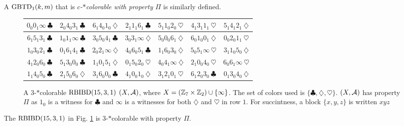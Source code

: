 \documentclass[draft, 11pt]{article}
\begin{document}
 A $\textrm{GBTD}_1(k,m)$ that is {\em $c$-$*$colorable with property $\Pi$} is similarly defined.
 
 \begin{figure}[!t]
\renewcommand{\arraystretch}{1.2}
\centering
\begin{tabular}{|c|c|c|c|c|c|c|}
\hline
$0_0 0_1 \infty ~ \clubsuit$ & $2_0 4_0 3_1 ~ \clubsuit$ & $ 6_1 4_0 1_0  ~
\diamondsuit$ & $ 2_1 1_1 6_1 ~ \clubsuit$ & $ 5_1 1_0 2_0 ~ \heartsuit$ & $ 4_1
3_1 1_1 ~ \heartsuit$ & $ 5_1 4_1 2_1 ~ \diamondsuit$ \\ \hline

$ 6_1 5_1 3_1 ~ \clubsuit$ & $ 1_0 1_1 \infty ~ \clubsuit$ & $ 3_0 5_0 4_1 ~
\clubsuit$ & $ 3_0 3_1 \infty ~ \diamondsuit$ & $ 5_0 0_0 6_1 ~ \diamondsuit$ & $
6_0 1_0 0_1  ~ \diamondsuit$ & $ 0_0 2_0 1_1 ~ \heartsuit$ \\ \hline

$ 1_0 3_0 2_1 ~ \clubsuit$ & $ 0_1 6_1 4_1 ~ \clubsuit$ & $ 2_0 2_1 \infty ~
\diamondsuit$ & $ 4_0 6_0 5_1 ~ \clubsuit$ & $ 1_1 6_0 3_0 ~ \diamondsuit$ & $ 5_0
5_1 \infty ~ \heartsuit$ & $ 3_1 1_0 5_0  ~ \diamondsuit$ \\ \hline

$ 4_1 2_0 6_0 ~ \clubsuit$ & $ 5_1 3_0 0_0 ~ \clubsuit$ & $ 1_1 0_1 5_1 ~
\diamondsuit$ & $ 0_1 5_0 2_0 ~ \heartsuit$ & $ 4_0 4_1 \infty ~ \diamondsuit$ & $
2_1 0_0 4_0 ~ \heartsuit$ & $ 6_0 6_1 \infty ~ \heartsuit$ \\ \hline

$ 1_1 4_0 5_0 ~ \clubsuit$ & $ 2_1 5_0 6_0  ~ \diamondsuit$ & $ 3_1 6_0 0_0 ~
\clubsuit$ & $ 4_1 0_0 1_0 ~ \diamondsuit$ & $ 3_1 2_1 0_1 ~ \heartsuit$ & $ 6_1
2_0 3_0 ~ \clubsuit$ & $ 0_1 3_0 4_0 ~ \diamondsuit$ \\ \hline
\end{tabular}
\caption{A $3$-$*$colorable $\textrm{RBIBD}(15,3,1)$ $(X,\mathcal A)$, where $X=(\mathbb Z_7\times\mathbb Z_2)\cup\{\infty\}$. The set of colors
used is $\{\clubsuit,\diamondsuit,\heartsuit\}$. $(X,\mathcal A)$ has property $\Pi$ as $1_0$ is a witness for $\clubsuit$ and $\infty$ is a witnesses for both $\diamondsuit$ and $\heartsuit$ in row $1$. For succintness, a block $\{x,y,z\}$ is written $xyz$} 
\label{fig:rbibd15}
\end{figure}


                                                      


\begin{example}
\label{eg:5}
The $\textrm{RBIBD}(15,3,1)$ in Fig. \ref{fig:rbibd15} is $3$-$*$colorable with property $\Pi$.
\end{example}
                                                      
\end{document}
